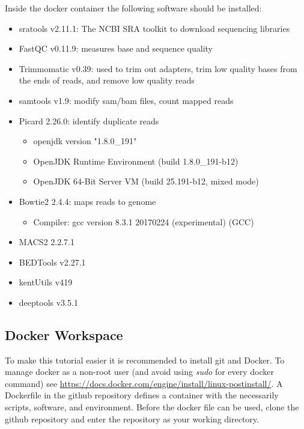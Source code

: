 \documentclass{article}
\begin{document}
\begin{sloppypar}
Inside the docker container the following software should be installed:
\begin{itemize}
    \item sratools v2.11.1: The NCBI SRA toolkit to download sequencing libraries
    \item FastQC v0.11.9: measures base and sequence quality \cite{FastQC}
    \item Trimmomatic v0.39: used to trim out adapters, trim low quality bases from the ends of reads, and remove low quality
    reads \cite{Trimmomatic}
    \item samtools v1.9: modify sam/bam files, count mapped reads \cite{SAMtools}
    \item Picard 2.26.0: identify duplicate reads \cite{Picard}
    \begin{itemize}
        \item openjdk version "1.8.0\_191"
        \item OpenJDK Runtime Environment (build 1.8.0\_191-b12)
        \item OpenJDK 64-Bit Server VM (build 25.191-b12, mixed mode)
    \end{itemize}
    \item Bowtie2 2.4.4: maps reads to genome \cite{bowtie2}
    \begin{itemize}
        \item Compiler: gcc version 8.3.1 20170224 (experimental) (GCC)
    \end{itemize}
    \item MACS2 2.2.7.1 \cite{macs}
    \item BEDTools v2.27.1 \cite{bedtools}
    \item kentUtils v419 \cite{kentUtils}
    \item deeptools v3.5.1 \cite{deeptools}
\end{itemize}

\subsection{Docker Workspace}
To make this tutorial easier it is recommended to install git and Docker. To manage docker as a non-root user (and avoid using \emph{sudo} for every docker command) see \url{https://docs.docker.com/engine/install/linux-postinstall/}. A Dockerfile in the github repository defines a container with the necessarily scripts, software, and environment. Before the docker file can be used, clone the github repository and enter the repository as your working directory. 


\end{sloppypar}
\end{document}
